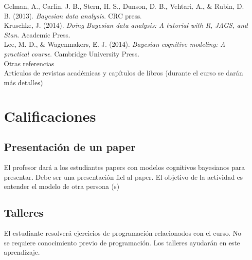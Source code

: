 \documentclass[letterpaper]{inzane_syllabus} %
\begin{document}
Gelman, A., Carlin, J. B., Stern, H. S., Dunson, D. B., Vehtari, A., \& Rubin, D. B. (2013). \textit{Bayesian data analysis}. CRC press.\\

Kruschke, J. (2014). \textit{Doing Bayesian data analysis: A tutorial with R, JAGS, and Stan}. Academic Press.\\

Lee, M. D., \& Wagenmakers, E. J. (2014). \textit{Bayesian cognitive modeling: A practical course}. Cambridge University Press. \\


{\color{myCOLOR} Otras referencias}\\

Art\'iculos de revistas acad\'emicas y cap\'itulos de libros (durante el curso se dar\'an m\'as detalles)

\vspace{0.75cm}
\section{Calificaciones}

\begin{twentyshort}
\end{twentyshort}

 \subsection{Presentaci\'on de un paper}
El profesor dar\'a a los estudiantes papers con modelos cognitivos bayesianos para presentar. Debe ser una presentaci\'on fiel al paper. El objetivo de la actividad es entender el modelo de otra persona (s)

\subsection{Talleres}
 El estudiante resolver\'a ejercicios de programaci\'on relacionados con el curso. No se requiere conocimiento previo de programaci\'on. Los talleres ayudar\'an en este aprendizaje. 
 
\end{document}
